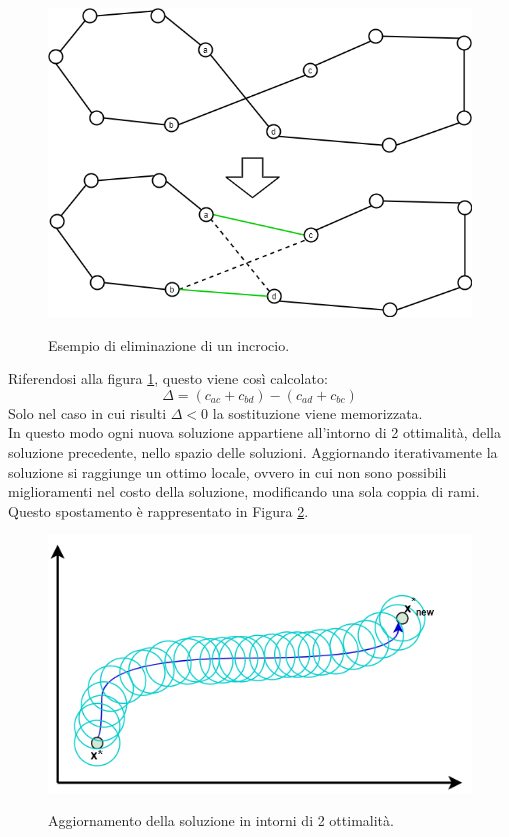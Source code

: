 \begin{figure}[h] 
\begin{center} 
  \includegraphics[scale=0.5]{Images/switch}\\ 
  \caption{\footnotesize{Esempio di eliminazione di un incrocio.}}
  \label{switch}
\end{center}
\end{figure}
Riferendosi alla figura \ref{switch}, questo viene così calcolato:\\
 $$\Delta = (c_{ac} + c_{bd}) - (c_{ad} + c_{bc})$$
 Solo nel caso in cui risulti $\Delta < 0$ la sostituzione viene memorizzata.\\
In questo modo ogni nuova soluzione appartiene all'intorno di 2 ottimalità, della soluzione precedente, nello spazio delle soluzioni. Aggiornando iterativamente la soluzione si raggiunge un ottimo locale, ovvero in cui non sono possibili miglioramenti nel costo della soluzione, modificando una sola coppia di rami. Questo spostamento è rappresentato in Figura \ref{two_optimality}. 
\begin{figure}[h] 
\begin{center} 
  \includegraphics[scale=0.4]{Images/two_optimality}\\ 
  \caption{\footnotesize{Aggiornamento della soluzione in intorni di 2 ottimalità.}}
  \label{two_optimality}
\end{center}
\end{figure}
